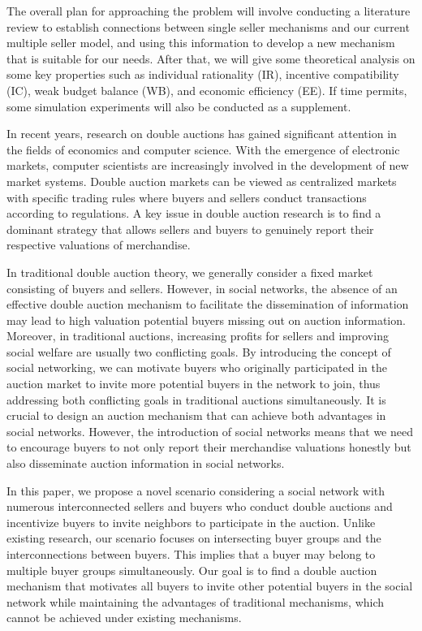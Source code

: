 The overall plan for approaching the problem will involve conducting a literature review to establish connections between single seller mechanisms and our current multiple seller model, and using this information to develop a new mechanism that is suitable for our needs. After that, we will give some theoretical analysis on some key properties such as individual rationality (IR), incentive compatibility (IC), weak budget balance (WB), and economic efficiency (EE). If time permits, some simulation experiments will also be conducted as a supplement.




In recent years, research on double auctions has gained significant attention in the fields of economics and computer science. With the emergence of electronic markets, computer scientists are increasingly involved in the development of new market systems. Double auction markets can be viewed as centralized markets with specific trading rules where buyers and sellers conduct transactions according to regulations. A key issue in double auction research is to find a dominant strategy that allows sellers and buyers to genuinely report their respective valuations of merchandise.

In traditional double auction theory, we generally consider a fixed market consisting of buyers and sellers. However, in social networks, the absence of an effective double auction mechanism to facilitate the dissemination of information may lead to high valuation potential buyers missing out on auction information. Moreover, in traditional auctions, increasing profits for sellers and improving social welfare are usually two conflicting goals. By introducing the concept of social networking, we can motivate buyers who originally participated in the auction market to invite more potential buyers in the network to join, thus addressing both conflicting goals in traditional auctions simultaneously. It is crucial to design an auction mechanism that can achieve both advantages in social networks. However, the introduction of social networks means that we need to encourage buyers to not only report their merchandise valuations honestly but also disseminate auction information in social networks.

In this paper, we propose a novel scenario considering a social network with numerous interconnected sellers and buyers who conduct double auctions and incentivize buyers to invite neighbors to participate in the auction. Unlike existing research, our scenario focuses on intersecting buyer groups and the interconnections between buyers. This implies that a buyer may belong to multiple buyer groups simultaneously. Our goal is to find a double auction mechanism that motivates all buyers to invite other potential buyers in the social network while maintaining the advantages of traditional mechanisms, which cannot be achieved under existing mechanisms.

